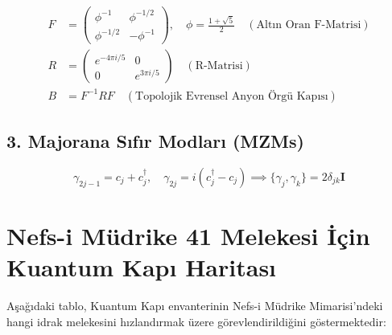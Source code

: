 \documentclass[11pt, a4paper]{article}
\begin{document}
\begin{align}
F &= \begin{pmatrix} \phi^{-1} & \phi^{-1/2} \\ \phi^{-1/2} & -\phi^{-1} \end{pmatrix}, \quad \phi = \frac{1+\sqrt{5}}{2} \quad (\text{Altın Oran F-Matrisi}) \\
R &= \begin{pmatrix} e^{-4\pi i / 5} & 0 \\ 0 & e^{3\pi i / 5} \end{pmatrix} \quad (\text{R-Matrisi}) \\
B &= F^{-1} R F \quad (\text{Topolojik Evrensel Anyon Örgü Kapısı})
\end{align}

\subsection{3. Majorana Sıfır Modları (MZMs)}
\begin{equation}
\gamma_{2j-1} = c_j + c_j^\dagger, \quad \gamma_{2j} = i(c_j^\dagger - c_j) \implies \{\gamma_j, \gamma_k\} = 2 \delta_{jk} \mathbf{I}
\end{equation}

\section{Nefs-i Müdrike 41 Melekesi İçin Kuantum Kapı Haritası}

Aşağıdaki tablo, Kuantum Kapı envanterinin Nefs-i Müdrike Mimarisi'ndeki hangi idrak melekesini hızlandırmak üzere görevlendirildiğini göstermektedir:
\end{document}
